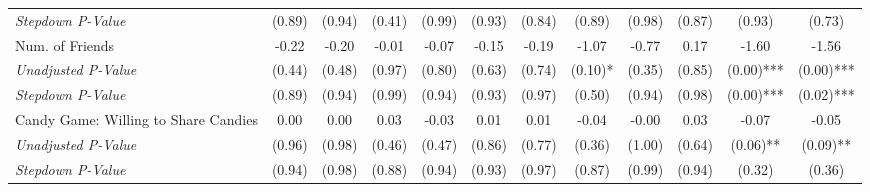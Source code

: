 \begin{tabular}{l c c c c c c c c c c c}
\quad \textit{Stepdown P-Value} & (0.89) & (0.94) & (0.41) & (0.99) & (0.93) & (0.84) & (0.89) & (0.98) & (0.87) & (0.93) & (0.73) \\
Num. of Friends & -0.22 & -0.20 & -0.01 & -0.07 & -0.15 & -0.19 & -1.07 & -0.77 & 0.17 & -1.60 & -1.56 \\
\quad \textit{Unadjusted P-Value} & (0.44) & (0.48) & (0.97) & (0.80) & (0.63) & (0.74) & (0.10)* & (0.35) & (0.85) & (0.00)*** & (0.00)*** \\
\quad \textit{Stepdown P-Value} & (0.89) & (0.94) & (0.99) & (0.94) & (0.93) & (0.97) & (0.50) & (0.94) & (0.98) & (0.00)*** & (0.02)*** \\
Candy Game: Willing to Share Candies & 0.00 & 0.00 & 0.03 & -0.03 & 0.01 & 0.01 & -0.04 & -0.00 & 0.03 & -0.07 & -0.05 \\
\quad \textit{Unadjusted P-Value} & (0.96) & (0.98) & (0.46) & (0.47) & (0.86) & (0.77) & (0.36) & (1.00) & (0.64) & (0.06)** & (0.09)** \\
\quad \textit{Stepdown P-Value} & (0.94) & (0.98) & (0.88) & (0.94) & (0.93) & (0.97) & (0.87) & (0.99) & (0.94) & (0.32) & (0.36) \\
\bottomrule
\end{tabular}
